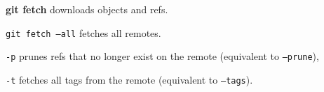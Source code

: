 %

\textbf{git fetch} downloads objects and refs.

\texttt{git fetch --all} fetches all remotes.

\begin{compactenum}
\item [\texttt{-p}] prunes refs that no longer exist on the remote (equivalent to \texttt{--prune}),
\item [\texttt{-t}] fetches all tags from the remote (equivalent to \texttt{--tags}).
\end{compactenum}

%